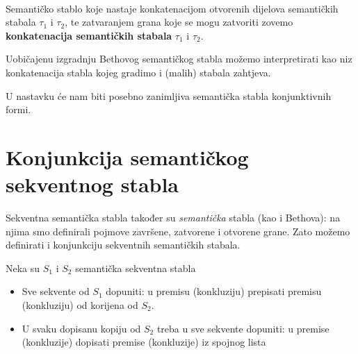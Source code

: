 \begin{center}
 
\end{center}


\begin{pr}\strut \ 

\begin{center}

\end{center}

\end{pr}  
 
\begin{defn}%
 Semantičko stablo koje nastaje konkatenacijom otvorenih dijelova semantičkih stabala $\tau_1$ i $\tau_2$, te zatvaranjem
grana koje se mogu zatvoriti zovemo \textbf{konkatenacija semantičkih stabala} $\tau_1$ i $\tau_2$.
\end{defn}

Uobičajenu izgradnju Bethovog semantičkog stabla možemo interpretirati kao niz konkatenacija stabla
kojeg gradimo i (malih) stabala zahtjeva.

%  
 
 
U nastavku će nam biti posebno zanimljiva semantička stabla konjunktivnih formi. 




\section{Konjunkcija semantičkog sekventnog stabla}


% 


Sekventna semantička stabla također su \textit{semantička} stabla (kao i Bethova): na njima  smo definirali pojmove
završene, zatvorene i otvorene grane. Zato možemo definirati i 
konjunkciju sekventnih semantičkih stabala.

\begin{defn}
Neka su $S_1$ i $S_2$ semantička sekventna stabla
\begin{itemize}
 \item Sve sekvente od $S_1$ dopuniti: u premisu (konkluziju) prepisati premisu (konkluziju) od korijena od $S_2$.
 \item U svaku dopisanu kopiju od $S_2$ treba u sve sekvente dopuniti: u premise (konkluzije) dopisati premise
(konkluzije) iz spojnog lista
\end{itemize}
\end{defn}


